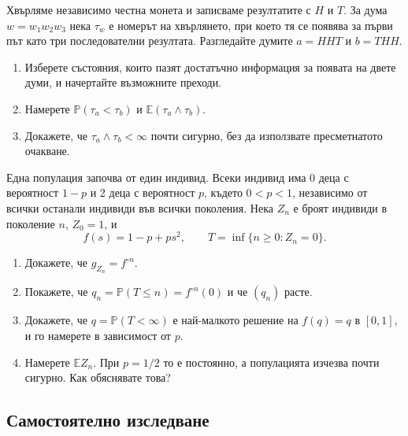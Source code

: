 \documentclass[11pt,a4paper]{article}
\newenvironment{enumeratea}{\begin{enumerate}[label=(\alph*),itemsep=0.28em,topsep=0.25em]}{\end{enumerate}}
\newcommand{\Pbb}{\mathbb P}
\newcommand{\Ebb}{\mathbb E}
\newcounter{problem}[section]
\begin{document}
\begin{problemstar}\label{prob:week4-penney}
Хвърляме независимо честна монета и записваме резултатите с $H$ и $T$.
За дума $w=w_1w_2w_3$ нека $\tau_w$ е номерът на хвърлянето, при което тя
се появява за първи път като три последователни резултата.
Разгледайте думите $a=HHT$ и $b=THH$.
\begin{enumeratea}
  \item Изберете състояния, които пазят достатъчно информация за появата на
  двете думи, и начертайте възможните преходи.
  \item Намерете $\Pbb(\tau_a<\tau_b)$ и $\Ebb(\tau_a\wedge\tau_b)$.
  \item Докажете, че $\tau_a\wedge\tau_b<\infty$ почти сигурно,
  без да използвате пресметнатото очакване.
\end{enumeratea}
\end{problemstar}

\begin{problemstar}
Една популация започва от един индивид. Всеки индивид има 0 деца с вероятност
$1-p$ и 2 деца с вероятност $p$, където $0<p<1$, независимо от всички останали
индивиди във всички поколения. Нека $Z_n$ е броят индивиди в поколение $n$,
$Z_0=1$, и
\[
f(s)=1-p+ps^2,\qquad T=\inf\{n\ge0:Z_n=0\}.
\]
\begin{enumeratea}
  \item Докажете, че $g_{Z_n}=f^{\circ n}$.
  \item Покажете, че $q_n=\Pbb(T\le n)=f^{\circ n}(0)$ и че $(q_n)$ расте.
  \item Докажете, че $q=\Pbb(T<\infty)$ е най-малкото решение на $f(q)=q$
  в $[0,1]$, и го намерете в зависимост от $p$.
  \item Намерете $\Ebb Z_n$. При $p=1/2$ то е постоянно, а популацията
  изчезва почти сигурно. Как обяснявате това?
\end{enumeratea}
\end{problemstar}

\subsection*{Самостоятелно изследване}
\end{document}
